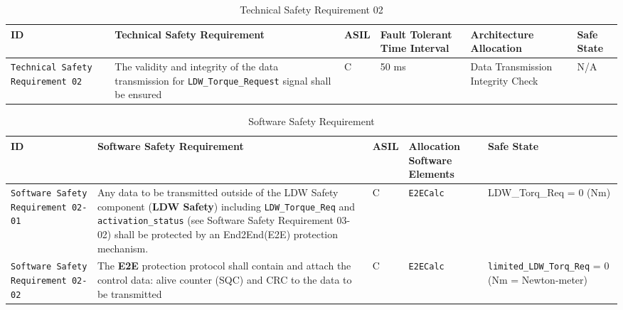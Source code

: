 \begin{table}[!htpb]
\caption{Technical Safety Requirement 02}
\begin{center}
\scriptsize
\renewcommand{\arraystretch}{1.4}
\begin{tabular}{ L{1.8cm}|L{5.2cm}|L{0.7cm}|L{1.3cm}|L{1.8cm}|L{2.0cm}  }
\hline
{}
ID &
Technical Safety Requirement  &
ASIL &
Fault Tolerant Time Interval  &  
Architecture Allocation  &  
Safe State \\\hline
\textcolor{harmonia-blue}{\texttt{Technical Safety Requirement 02}}  &
The validity and integrity of the data transmission for 
\textcolor{harmonia-blue}{\texttt{LDW\_Torque\_Request}}
  signal shall be ensured &
C &
50 ms  &
Data Transmission Integrity Check &
N/A
\\\hline
\end{tabular}
\end{center}
\label{tab:tr02}
\end{table}




\begin{table}[!htpb]
\caption{Software Safety Requirement}
\begin{center}
\scriptsize
\renewcommand{\arraystretch}{1.4}
\hspace*{-2.0cm}
\begin{tabular}{ L{1.7cm}|L{5.2cm}|L{0.5cm}|L{5.2cm}|L{3.0cm}  }
\hline
{}
ID &
Software Safety Requirement  &
ASIL &
Allocation Software Elements  &  
Safe State \\\hline
\textcolor{harmonia-blue}{\texttt{Software Safety Requirement 02-01}}  &
Any data to be transmitted outside of the 
LDW Safety 
component (\textbf{LDW Safety})
including 
\textcolor{dark-red}{\texttt{LDW\_Torque\_Req}}
and 
\textcolor{dark-red}{\texttt{activation\_status}}
(see Software Safety Requirement 03-02) shall
be protected by an End2End(E2E) protection mechanism.
&
C &
\texttt{E2ECalc}  &
  LDW\_Torq\_Req = 0 (Nm)
\\\hline
\textcolor{harmonia-blue}{\texttt{Software Safety Requirement 02-02}}  &
The \textbf{E2E} protection protocol shall contain and attach the control data: alive
counter (SQC) and CRC to the data to be transmitted
 &
C &
\texttt{E2ECalc}  &
\textcolor{dark-red}{\texttt{limited\_LDW\_Torq\_Req}} = 0 (Nm = Newton-meter)
\\\hline
\end{tabular}
\end{center}
\label{tab:sr02}
\end{table}



